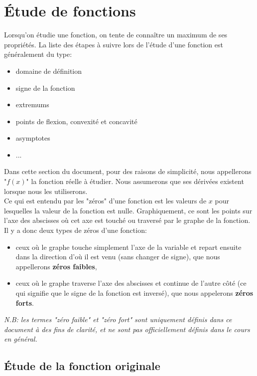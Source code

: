 \documentclass{article}
\begin{document}
\section{Étude de fonctions}
Lorsqu'on étudie une fonction, on tente de connaître un maximum de ses propriétés. La liste des étapes à suivre lors de l'étude d'une fonction est généralement du type:
\begin{itemize}
	\item domaine de définition
	\item signe de la fonction
	\item extremums
	\item points de flexion, convexité et concavité
	\item asymptotes
	\item ... %
\end{itemize}

Dans cette section du document, pour des raisons de simplicité, nous appellerons "\(f(x)\)" la fonction réelle à étudier. Nous assumerons que ses dérivées existent lorsque nous les utiliserons. \\
Ce qui est entendu par les "zéros" d'une fonction est les valeurs de \(x\) pour lesquelles la valeur de la fonction est nulle. Graphiquement, ce sont les points sur l'axe des abscisses où cet axe est touché ou traversé par le graphe de la fonction. \\
Il y a donc deux types de zéros d'une fonction: 
\begin{itemize}
	\item ceux où le graphe touche simplement l'axe de la variable et repart ensuite dans la direction d'où il est venu (sans changer de signe), que nous appellerons \textbf{zéros faibles}, %
	\item ceux où le graphe traverse l'axe des abscisses et continue de l'autre côté (ce qui signifie que le signe de la fonction est inversé), que nous appelerons \textbf{zéros forts}.
\end{itemize}
\emph{N.B: les termes "zéro faible" et "zéro fort" sont uniquement définis dans ce document à des fins de clarité, et ne sont pas officiellement définis dans le cours en général.}

\subsection{Étude de la fonction originale}
\end{document}
